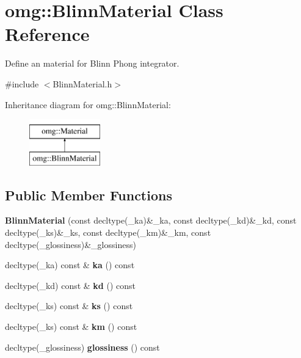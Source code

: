 \hypertarget{classomg_1_1_blinn_material}{}\section{omg\+::Blinn\+Material Class Reference}
\label{classomg_1_1_blinn_material}


Define an material for Blinn Phong integrator.  




{\ttfamily \#include $<$Blinn\+Material.\+h$>$}

Inheritance diagram for omg\+::Blinn\+Material\+:\begin{figure}[H]
\begin{center}
\leavevmode
\includegraphics[height=2.000000cm]{classomg_1_1_blinn_material}
\end{center}
\end{figure}
\subsection*{Public Member Functions}
\begin{DoxyCompactItemize}
\item 
\mbox{\label{classomg_1_1_blinn_material_a6b1157fad63134fae3a16214d8239c4f}} 
{\bfseries Blinn\+Material} (const decltype(\+\_\+ka)\&\+\_\+ka, const decltype(\+\_\+kd)\&\+\_\+kd, const decltype(\+\_\+ks)\&\+\_\+ks, const decltype(\+\_\+km)\&\+\_\+km, const decltype(\+\_\+glossiness)\&\+\_\+glossiness)
\item 
\mbox{\label{classomg_1_1_blinn_material_af12755a8887096efea8028822ff89906}} 
decltype(\+\_\+ka) const  \& {\bfseries ka} () const
\item 
\mbox{\label{classomg_1_1_blinn_material_a2fe4f3091c1dfe0c5e932f44a81cc498}} 
decltype(\+\_\+kd) const  \& {\bfseries kd} () const
\item 
\mbox{\label{classomg_1_1_blinn_material_ae81b1e2d9e8d59c183b5f83d763624a6}} 
decltype(\+\_\+ks) const  \& {\bfseries ks} () const
\item 
\mbox{\label{classomg_1_1_blinn_material_a903f8ec438a3082e0fe0eded4711bdd1}} 
decltype(\+\_\+ks) const  \& {\bfseries km} () const
\item 
\mbox{\label{classomg_1_1_blinn_material_a8cb707ebce02385ef495f0f619b33985}} 
decltype(\+\_\+glossiness) {\bfseries glossiness} () const
\end{DoxyCompactItemize}



